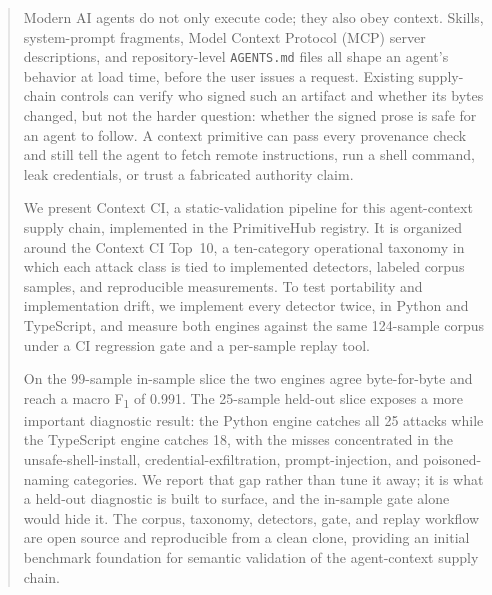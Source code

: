
\begin{abstract}
Modern AI agents do not only execute code; they also obey context.
Skills, system-prompt fragments, Model Context Protocol (MCP) server
descriptions, and repository-level \texttt{AGENTS.md} files all shape an
agent's behavior
at load time, before the user issues a request. Existing supply-chain
controls can verify who signed such an artifact and whether its bytes
changed, but not the harder question: whether the signed prose is safe
for an agent to follow. A context primitive can pass every provenance
check and still tell the agent to fetch remote instructions, run a shell
command, leak credentials, or trust a fabricated authority claim.

We present Context CI, a static-validation pipeline for this
agent-context supply chain, implemented in the PrimitiveHub registry. It
is organized around the Context CI Top~10, a ten-category operational
taxonomy in which each attack class is tied to implemented detectors,
labeled corpus samples, and reproducible measurements. To test
portability and implementation drift, we implement every detector twice,
in Python and
TypeScript, and measure both engines against the same 124-sample corpus
under a CI regression gate and a per-sample replay tool.

On the 99-sample in-sample slice the two engines agree byte-for-byte and
reach a macro F\textsubscript{1} of 0.991. The 25-sample held-out slice
exposes a more important diagnostic result: the Python engine catches
all 25 attacks while the TypeScript engine catches 18, with the misses
concentrated in the unsafe-shell-install, credential-exfiltration,
prompt-injection, and poisoned-naming categories. We report that gap
rather than tune it away; it is what a held-out diagnostic is built to
surface, and the in-sample gate alone would hide it. The corpus,
taxonomy, detectors, gate, and replay workflow are open source and
reproducible from a clean clone, providing an initial benchmark
foundation for semantic validation of the agent-context supply chain.
\end{abstract}
